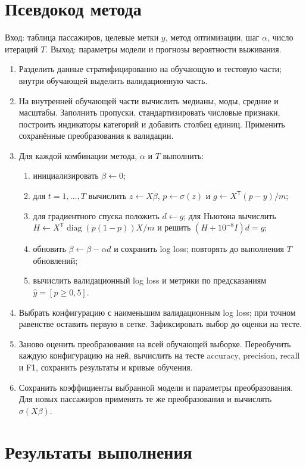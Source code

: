 \section{Псевдокод метода}
Вход: таблица пассажиров, целевые метки $y$, метод оптимизации, шаг $\alpha$, число итераций $T$. Выход: параметры модели и прогнозы вероятности выживания.
\begin{enumerate}[label=\arabic*.]
\item Разделить данные стратифицированно на обучающую и тестовую части; внутри обучающей выделить валидационную часть.
\item На внутренней обучающей части вычислить медианы, моды, средние и масштабы. Заполнить пропуски, стандартизировать числовые признаки, построить индикаторы категорий и добавить столбец единиц. Применить сохранённые преобразования к валидации.
\item Для каждой комбинации метода, $\alpha$ и $T$ выполнить:
\begin{enumerate}[label=\alph*)]
\item инициализировать $\beta\leftarrow0$;
\item для $t=1,\ldots,T$ вычислить $z\leftarrow X\beta$, $p\leftarrow\sigma(z)$ и $g\leftarrow X^\mathsf{T}(p-y)/m$;
\item для градиентного спуска положить $d\leftarrow g$; для Ньютона вычислить $H\leftarrow X^\mathsf{T}\operatorname{diag}(p(1-p))X/m$ и решить $(H+10^{-8}I)d=g$;
\item обновить $\beta\leftarrow\beta-\alpha d$ и сохранить log loss; повторять до выполнения $T$ обновлений;
\item вычислить валидационный log loss и метрики по предсказаниям $\widehat y=[p\geq0{,}5]$.
\end{enumerate}
\item Выбрать конфигурацию с наименьшим валидационным log loss; при точном равенстве оставить первую в сетке. Зафиксировать выбор до оценки на тесте.
\item Заново оценить преобразования на всей обучающей выборке. Переобучить каждую конфигурацию на ней, вычислить на тесте accuracy, precision, recall и F1, сохранить результаты и кривые обучения.
\item Сохранить коэффициенты выбранной модели и параметры преобразования. Для новых пассажиров применять те же преобразования и вычислять $\sigma(X\beta)$.
\end{enumerate}

\section{Результаты выполнения}
